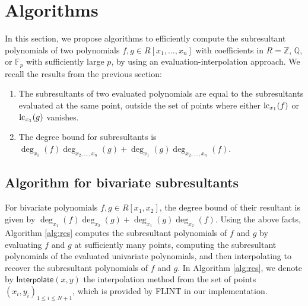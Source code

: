 \section{Algorithms}

In this section, we propose algorithms to efficiently compute the subresultant polynomials of two polynomials $f,g\in R[x_1,\dots,x_n]$ with coefficients in $R=\mathbb{Z}$, $\mathbb{Q}$, or $\mathbb{F}_p$ with sufficiently large $p$, by using an evaluation-interpolation approach. We recall the results from the previous section:

\begin{enumerate}
  \item The subresultants of two evaluated polynomials are equal to the subresultants evaluated at the same point, outside the set of points where either $\operatorname{lc}_{x_1}(f)$ or $\operatorname{lc}_{x_1}(g)$ vanishes.
  \item The degree bound for subresultants is $\deg_{x_1}(f)\deg_{x_2,\dots,x_n}(g) + \deg_{x_1}(g)\deg_{x_2,\dots,x_n}(f)$.
\end{enumerate}

\subsection{Algorithm for bivariate subresultants}

For bivariate polynomials $f,g\in R[x_1,x_2]$, the degree bound of their resultant is given by $\deg_{x_1}(f)\deg_{x_2}(g)+\deg_{x_1}(g)\deg_{x_2}(f)$. Using the above facts, Algorithm \ref{alg:res} computes the subresultant polynomials of $f$ and $g$ by evaluating $f$ and $g$ at sufficiently many points, computing the subresultant polynomials of the evaluated univariate polynomials, and then interpolating to recover the subresultant polynomials of $f$ and $g$. In Algorithm \ref{alg:res}, we denote by $\textsf{Interpolate}(x,y)$ the interpolation method from the set of points $(x_i,y_i)_{1\leq i\leq N+1}$, which is provided by FLINT in our implementation.


